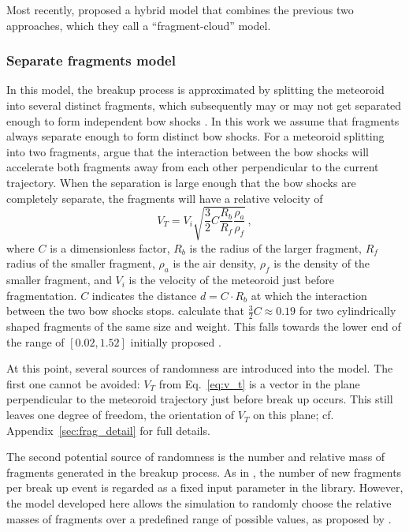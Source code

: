 Most recently, \cite{wheeler2017fragmentcloud} proposed a hybrid model that combines the previous two approaches, which they call a ``fragment-cloud'' model.

\subsubsection{Separate fragments model}
\label{sec:fragments_model}
In this model, the breakup process is approximated by splitting the meteoroid into several distinct fragments, which subsequently may or may not get separated enough to form independent bow shocks \citep{artemieva1996interaction}. In this work we assume that fragments always separate enough to form distinct bow shocks. For a meteoroid splitting into two fragments, \cite{passey1980effects} argue that the interaction between the bow shocks will accelerate both fragments away from each other perpendicular to the current trajectory. When the separation is large enough that the bow shocks are completely separate, the fragments will have a relative velocity of
\begin{equation}
    V_T = V_i\sqrt{\frac{3}{2}C\frac{R_b}{R_f}\frac{\rho_a}{\rho_f}}\,,
    \label{eq:v_t}
\end{equation}
where $C$ is a dimensionless factor, $R_b$ is the radius of the larger fragment, $R_f$ radius of the smaller fragment, $\rho_a$ is the air density, $\rho_f$ is the density of the smaller fragment,
and $V_i$ is the velocity of the meteoroid just before fragmentation. $C$ indicates the distance $d = C\cdot R_b$ at which the interaction between the two bow shocks stops. \cite{artemieva2001motion} calculate that $\frac{3}{2}C\approx 0.19$ for two cylindrically shaped fragments of the same size and weight. This falls towards the lower end of the range of $[0.02, 1.52]$ initially proposed \citep{passey1980effects}.

At this point, several sources of randomness are introduced into the model. The first one cannot be avoided: $V_T$ from Eq.~\ref{eq:v_t} is a vector in the plane perpendicular to the meteoroid trajectory just before break up occurs. This still leaves one degree of freedom, the orientation of $V_T$ on this plane; cf. Appendix~\ref{sec:frag_detail} for full details.

The second potential source of randomness is the number and relative mass of fragments generated in the breakup process. As in \cite{wheeler2018atmospheric}, the number of new fragments per break up event is regarded as a fixed input parameter in the library. However, the model developed here allows the simulation to randomly choose the relative masses of fragments over a predefined range of possible values, as proposed by \cite{newland2019CFM18}. 

